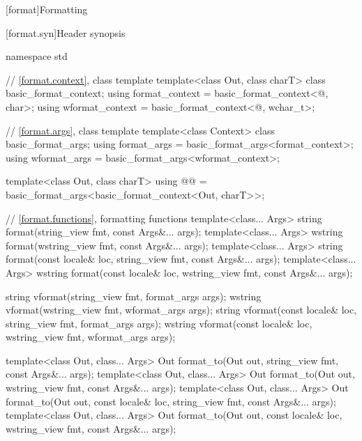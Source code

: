 
[format]{Formatting}

[format.syn]{Header  synopsis}

%
%
%
%
%
%
%
%
%
%
%
\begin{codeblock}
namespace std {
  // \ref{format.context}, class template 
  template<class Out, class charT> class basic_format_context;
  using format_context = basic_format_context<@\unspec@, char>;
  using wformat_context = basic_format_context<@\unspec@, wchar_t>;

  // \ref{format.args}, class template 
  template<class Context> class basic_format_args;
  using format_args = basic_format_args<format_context>;
  using wformat_args = basic_format_args<wformat_context>;

  template<class Out, class charT>
    using @@ = basic_format_args<basic_format_context<Out, charT>>;

  // \ref{format.functions}, formatting functions
  template<class... Args>
    string format(string_view fmt, const Args&... args);
  template<class... Args>
    wstring format(wstring_view fmt, const Args&... args);
  template<class... Args>
    string format(const locale& loc, string_view fmt, const Args&... args);
  template<class... Args>
    wstring format(const locale& loc, wstring_view fmt, const Args&... args);

  string vformat(string_view fmt, format_args args);
  wstring vformat(wstring_view fmt, wformat_args args);
  string vformat(const locale& loc, string_view fmt, format_args args);
  wstring vformat(const locale& loc, wstring_view fmt, wformat_args args);

  template<class Out, class... Args>
    Out format_to(Out out, string_view fmt, const Args&... args);
  template<class Out, class... Args>
    Out format_to(Out out, wstring_view fmt, const Args&... args);
  template<class Out, class... Args>
    Out format_to(Out out, const locale& loc, string_view fmt, const Args&... args);
  template<class Out, class... Args>
    Out format_to(Out out, const locale& loc, wstring_view fmt, const Args&... args);

}
\end{codeblock}
